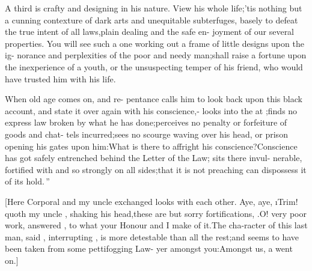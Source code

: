 \documentclass[twoside]{article}
\begin{document}
\lqq A third is crafty and designing in\break
\lqq his nature. View his whole life;\tsk ’tis\break
\lqq nothing but a cunning contexture of\break
\lqq dark arts and unequitable subterfuges,\break
\lqq basely to defeat the true intent of all\break
\lqq laws,\tsh plain dealing and the safe en-\break
\lqq joyment of our several properties.\tsh
{}
\lqq You will see such a one working out\break
\lqq a frame of little designs upon the ig-\break
\lqq norance and perplexities of the poor\break
\lqq and needy man;\tsk shall raise a fortune\break
\lqq upon the inexperience of a youth, or\break
\lqq the unsuspecting temper of his friend,\break
\lqq who would have trusted him with his\break
\lqq life.

\lqq When old age comes on, and re-\break
\lqq pentance calls him to look back upon\break
\lqq this black account, and state it over\break
\lqq again with his conscience,\tsh {}-\break
\lqq {} looks into the  at\break
\lqq {};\tsk finds no express law broken\break
\lqq by what he has done;\tsk perceives no\break
\lqq penalty or forfeiture of goods and chat-\break
\lqq tels incurred;\tsk sees no scourge waving\break
\lqq over his head, or prison opening his\break
\lqq gates upon him:\tsk What is there to\break
\lqq affright his conscience?\tsk Conscience
\lqq has got safely entrenched behind the\break
\lqq Letter of the Law; sits there invul-\break
\lqq nerable, fortified with  and \break
\lqq {} so strongly on all sides;\tsk that\break
\lqq it is not preaching can dispossess it of\break
\lqq its hold.\,”

[Here Corporal \trim and my uncle \toby exchanged
looks with each other.\tsk\break
Aye, \tsk aye, \i{Trim!} quoth my uncle \toby, shaking
his head,\tsk these are but sorry fortifications,
\trim.\tsh O! very poor work, answered \trim, to
what your Ho\-nour and I make of it.\tsh The cha-\break racter of this
last man, said \drslop, interrupting \trim,
is more detestable than\break
all the rest;\tsh and seems to have\break
been taken from some pettifogging Law-\break
yer amongst you:\tsk Amongst us, a\break
{}
went on.]
\end{document}
